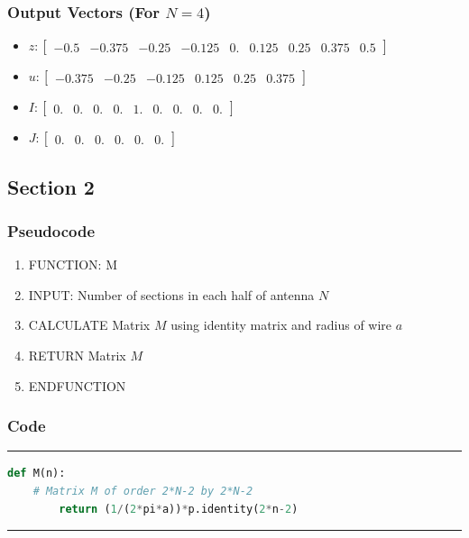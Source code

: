 \documentclass[12pt, a4paper]{article}
\begin{document}
\subsubsection{Output Vectors (For $N=4$)}
    \begin{itemize}
        \item   $z : \begin{bmatrix} -0.5 &  -0.375 & -0.25 & -0.125 & 0. & 0.125 & 0.25 & 0.375 & 0.5 \end{bmatrix} $
        \item   $u :  \begin{bmatrix} -0.375 & -0.25 &  -0.125 &  0.125 &  0.25 &  0.375 \end{bmatrix}$
        \item   $I :  \begin{bmatrix} 0. & 0. & 0. & 0. & 1. & 0. & 0. & 0. & 0.\end{bmatrix}$
        \item   $J :  \begin{bmatrix} 0. & 0. & 0. & 0. & 0. & 0. \end{bmatrix}$
    \end{itemize}
\subsection{Section 2}
\subsubsection{Pseudocode}
\begin{enumerate}

    \item \quad FUNCTION: M
    \item \quad \quad INPUT: Number of sections in each half of antenna $N$
    \item \quad \quad CALCULATE Matrix $M$ using identity matrix and radius of wire $a$
    \item \quad \quad RETURN Matrix $M$
    \item \quad ENDFUNCTION
  \end{enumerate}
\subsubsection{Code}
\vspace*{0.4cm}
\hrule
    \begin{lstlisting}[language=Python]
    def M(n):
    # Matrix M of order 2*N-2 by 2*N-2
        return (1/(2*pi*a))*p.identity(2*n-2)
    \end{lstlisting}
\hrule
\end{document}
